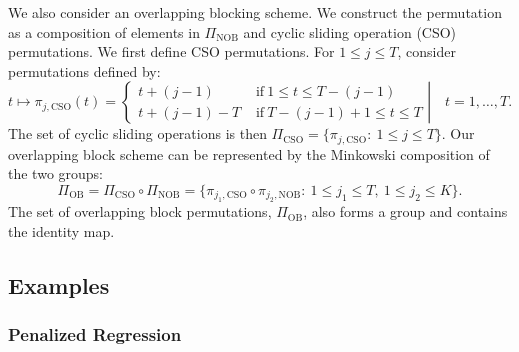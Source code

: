 \documentclass[final,12pt]{colt2018} %
\begin{document}

We also consider an overlapping blocking scheme. We construct the permutation as a composition of elements in $\Pi_{\text{NOB}}$ and cyclic sliding operation (CSO) permutations. We first define CSO permutations. For $1\leq j\leq T$, consider permutations defined by:
 $$ t \mapsto \pi_{j,\text{CSO}}(t)= \left. \begin{cases}
t+(j-1) & \text{ if}\ 1\leq t\leq T-(j-1)\\
t+(j-1)-T & \text{ if}\ T-(j-1)+1\leq t\leq T
\end{cases}  \right | \quad t=1,\dots,T. $$
The set of cyclic sliding operations is then $\Pi_{\text{CSO}}= \{\pi_{j,\text{CSO}}:\ 1\leq j\leq T \} $.  Our overlapping block scheme can be represented by the Minkowski composition of the two groups:
\begin{equation} \label{eq: overlapping permutation}
\Pi_{\text{OB}}=\Pi_{\text{CSO}} \circ \Pi_{\text{NOB}} =\{\pi_{j_1,\text{CSO}} \circ \pi_{j_2,\text{NOB}}:\ 1\leq j_1 \leq T,\ 1\leq j_2 \leq K  \} .
\end{equation}
The set of overlapping block permutations, $\Pi_{\text{OB}}$, also forms a group and contains the identity map. 


\subsection{Examples} \label{sec: examples}

\subsubsection{Penalized Regression}\label{sec: penalized regression}
\end{document}
